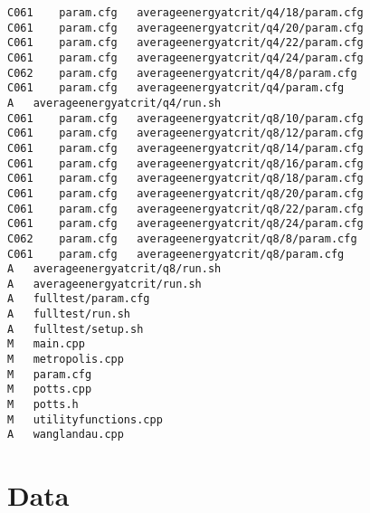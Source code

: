 \documentclass[12pt,a4paper,notitlepage,twoside]{memoir}
\begin{document}
\begin{lstlisting}[breaklines]
C061	param.cfg	averageenergyatcrit/q4/18/param.cfg
C061	param.cfg	averageenergyatcrit/q4/20/param.cfg
C061	param.cfg	averageenergyatcrit/q4/22/param.cfg
C061	param.cfg	averageenergyatcrit/q4/24/param.cfg
C062	param.cfg	averageenergyatcrit/q4/8/param.cfg
C061	param.cfg	averageenergyatcrit/q4/param.cfg
A	averageenergyatcrit/q4/run.sh
C061	param.cfg	averageenergyatcrit/q8/10/param.cfg
C061	param.cfg	averageenergyatcrit/q8/12/param.cfg
C061	param.cfg	averageenergyatcrit/q8/14/param.cfg
C061	param.cfg	averageenergyatcrit/q8/16/param.cfg
C061	param.cfg	averageenergyatcrit/q8/18/param.cfg
C061	param.cfg	averageenergyatcrit/q8/20/param.cfg
C061	param.cfg	averageenergyatcrit/q8/22/param.cfg
C061	param.cfg	averageenergyatcrit/q8/24/param.cfg
C062	param.cfg	averageenergyatcrit/q8/8/param.cfg
C061	param.cfg	averageenergyatcrit/q8/param.cfg
A	averageenergyatcrit/q8/run.sh
A	averageenergyatcrit/run.sh
A	fulltest/param.cfg
A	fulltest/run.sh
A	fulltest/setup.sh
M	main.cpp
M	metropolis.cpp
M	param.cfg
M	potts.cpp
M	potts.h
M	utilityfunctions.cpp
A	wanglandau.cpp

\end{lstlisting}

\section{Data}
\end{document}
